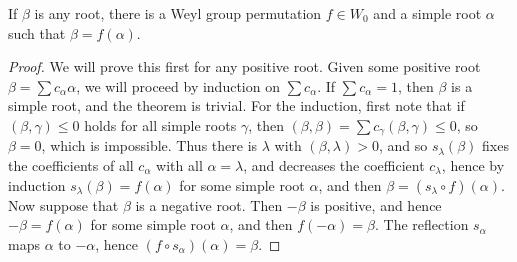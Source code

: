 \begin{theorem}
    If $\beta$ is any root, there is a Weyl group permutation $f \in W_0$ and a simple root $\alpha$ such that $\beta = f(\alpha)$.
\end{theorem}
\begin{proof}
    We will prove this first for any positive root. Given some positive root $\beta = \sum c_\alpha \alpha$, we will proceed by induction on $\sum c_\alpha$. If $\sum c_\alpha = 1$, then $\beta$ is a simple root, and the theorem is trivial. For the induction, first note that if $(\beta, \gamma) \leq 0$ holds for all simple roots $\gamma$, then $(\beta, \beta) = \sum c_\gamma (\beta, \gamma) \leq 0$, so $\beta = 0$, which is impossible. Thus there is $\lambda$ with $(\beta, \lambda) > 0$, and so $s_\lambda(\beta)$ fixes the coefficients of all $c_\alpha$ with all $\alpha = \lambda$, and decreases the coefficient $c_\lambda$, hence by induction $s_\lambda(\beta) = f(\alpha)$ for some simple root $\alpha$, and then $\beta = (s_\lambda \circ f)(\alpha)$. Now suppose that $\beta$ is a negative root. Then $-\beta$ is positive, and hence $-\beta = f(\alpha)$ for some simple root $\alpha$, and then $f(-\alpha) = \beta$. The reflection $s_\alpha$ maps $\alpha$ to $-\alpha$, hence $(f \circ s_\alpha)(\alpha) = \beta$.
\end{proof}

